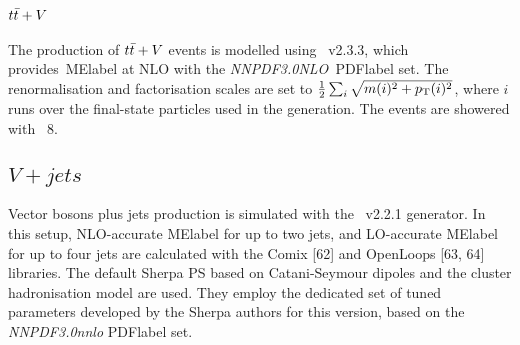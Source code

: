 \subsection{$t\bar{t}+V$}
The production of $t\bar{t}+V$ events is modelled using \MGMCatNLO~v2.3.3, which provides~\acrshort{MElabel} at
NLO with the \textit{NNPDF3.0NLO}~\acrshort{PDFlabel} set. The renormalisation and factorisation scales are set to $\frac{1}{2}\sum_i\sqrt{m(i)^2+p_{\text{T}}(i)^2}$, where $i$ runs over the final-state particles used in the generation. The events are showered with \PYTHIA~8.

\subsection{$V+jets$}
Vector bosons plus jets production is simulated with the \SHERPA~v2.2.1 generator. In this setup, NLO-accurate \acrshort{MElabel} for up to two jets, and LO-accurate \acrshort{MElabel} for up to four jets are calculated with the Comix [62] and OpenLoops [63, 64] libraries. %
The default Sherpa PS %
based on Catani-Seymour dipoles and the cluster hadronisation model are used. They employ the dedicated set of tuned parameters developed by the Sherpa authors for this version, based on the \textit{NNPDF3.0nnlo} \acrshort{PDFlabel} set. %

